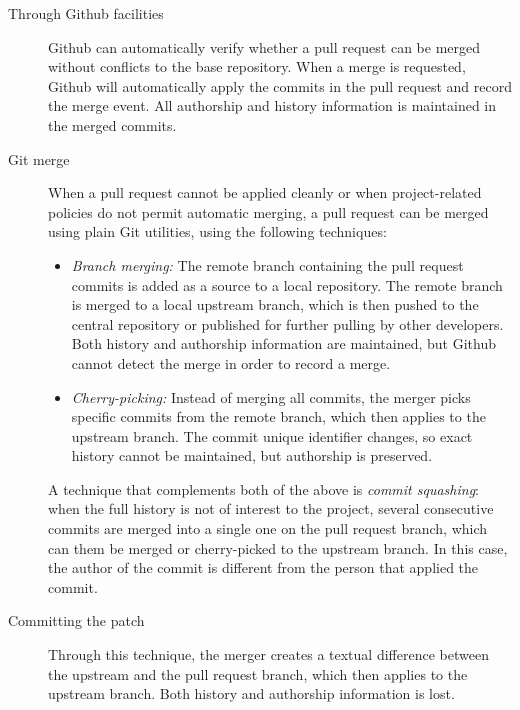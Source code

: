 \documentclass{sig-alternate}
\begin{document}
\begin{description}

  \item[Through Github facilities] Github can automatically verify whether a
    pull request can be merged without conflicts to the base repository. When a
    merge is requested, Github will automatically apply the commits in the pull
    request and record the merge event. All authorship and history information
    is maintained in the merged commits.

  \item[Git merge] When a pull request cannot be applied cleanly or when
    project-related policies do not permit automatic merging, a pull request
    can be merged using plain Git utilities, using the following
    techniques: 

    \begin{itemize}

      \item \emph{Branch merging:} The remote branch containing the pull
        request commits is added as a source to a local repository. The remote 
        branch is merged to a local upstream branch, which is then pushed to
        the central repository or published for further pulling by other
        developers. Both history and authorship information are maintained,
        but Github cannot detect the merge in order to record a merge. 

      \item \emph{Cherry-picking:} Instead of merging all commits, the merger
        picks specific commits from the remote branch, which then applies to the
        upstream branch. The commit unique identifier changes, so exact history
        cannot be maintained, but authorship is preserved.
    
    \end{itemize}

    A technique that complements both of the above is \emph{commit
    squashing}: when the full history is not of interest to the project,
    several consecutive commits are merged into a single one on the pull request
    branch, which can them be merged or cherry-picked to the upstream branch. In
    this case, the author of the commit is different from the person that
    applied the commit.

  \item [Committing the patch] Through this technique, the merger creates a
    textual difference between the upstream and the pull request branch, which
    then applies to the upstream branch. Both history and authorship information
    is lost.

\end{description}
\end{document}
